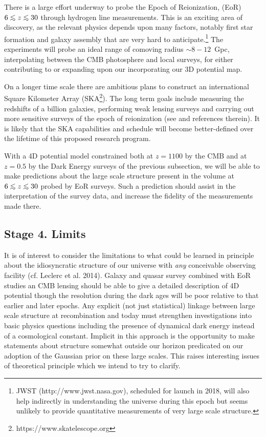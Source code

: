 \documentclass[psfig,11pt]{article}
\def\lo{\mathrel{\raise.3ex\hbox{$<$}\mkern-14mu\lower0.6ex\hbox{$\sim$}}}
\begin{document}
There is a large effort underway to probe the Epoch of Reionization, (EoR) $6\lo z\lo30$ through hydrogen line measurements. This is an exciting area of discovery, as the relevant physics depends upon many factors, notably first star formation and galaxy assembly that are very hard to anticipate.\footnote{JWST (http://www.jwst.nasa.gov), scheduled for launch in 2018, will also help indirectly in understanding the universe during this epoch but seems unlikely to provide quantitative measurements of very large scale structure.} The experiments will probe an ideal range of comoving radius $\sim8-12$~Gpc, interpolating between the CMB photosphere and local surveys,  for either contributing to or expanding upon our incorporating our 3D potential map.

On a longer time scale there are ambitious plans to construct an international Square Kilometer Array (SKA\footnote{https://www.skatelescope.org}). The long term goals include measuring the redshifts of a billion galaxies, performing weak lensing surveys and carrying out more sensitive surveys of the epoch of reionization (see  \cite{SKACosmology} and references therein). It is likely that the SKA capabilities and schedule will become better-defined over the lifetime of this proposed research program.

With a 4D potential model constrained both at $z=1100$ by the CMB and at $z=0.5$ by the Dark Energy surveys of the previous subsection, we will be able to make predictions about the large scale structure present in the volume at $6\lo z\lo30$ probed by EoR surveys. Such a prediction should assist in the interpretation of the survey data, and increase the fidelity of the measurements made there.


\subsection{Stage 4. Limits}

It is of interest to consider the limitations to what could be learned in principle about the idiosyncratic structure of our universe with {\it any} conceivable observing facility (cf. Leclerc et al. 2014). Galaxy and quasar survey combined with EoR studies an CMB lensing should be able to give a detailed description of 4D potential though the resolution during the dark ages will be poor relative to that earlier and later epochs. Any explicit (not just statistical) linkage between large scale structure at recombination and today must strengthen investigations into basic physics questions including the presence of dynamical dark energy instead of a cosmological constant. Implicit in this approach is the opportunity to make statements about structure somewhat outside our horizon predicated on our adoption of the Gaussian prior on these large scales. This raises interesting issues of theoretical principle which we intend to try to clarify.
\end{document}
